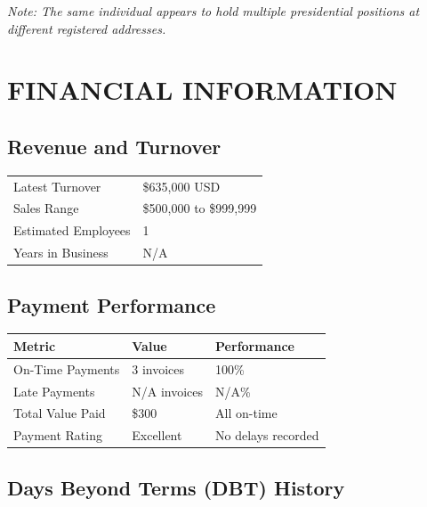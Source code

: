 \documentclass[11pt,a4paper]{article}
\begin{document}
\textit{Note: The same individual appears to hold multiple presidential positions at different registered addresses.}

\section{FINANCIAL INFORMATION}

\subsection{Revenue and Turnover}
\begin{tabularx}{\textwidth}{|l|X|}
\hline
\rowcolor{lightgray}
\multicolumn{2}{|c|}{\textbf{FINANCIAL OVERVIEW}} \\
\hline
Latest Turnover & \$635,000 USD \\
\hline
Sales Range & \$500,000 to \$999,999 \\
\hline
Estimated Employees & 1 \\
\hline
Years in Business & N/A \\
\hline
\end{tabularx}

\subsection{Payment Performance}
\begin{tabularx}{\textwidth}{|l|l|l|}
\hline
\rowcolor{lightgray}
\textbf{Metric} & \textbf{Value} & \textbf{Performance} \\
\hline
On-Time Payments & 3 invoices & 100\% \\
\hline
Late Payments & N/A invoices & N/A\% \\
\hline
Total Value Paid & \$300 & All on-time \\
\hline
Payment Rating & Excellent & No delays recorded \\
\hline
\end{tabularx}

\subsection{Days Beyond Terms (DBT) History}
\begin{center}
\end{center}
\end{document}
